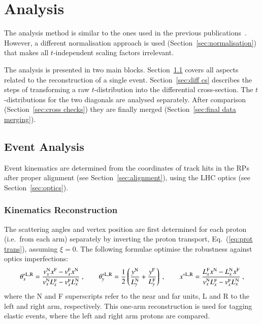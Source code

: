 \section{Analysis}
\label{sec:analysis}

The analysis method is similar to the ones used in the previous publications~\cite{epl101-el,prl111}.
However, a different normalisation approach is used (Section~\ref{sec:normalisation}) that makes all $t$-independent scaling factors irrelevant.

The analysis is presented in two main blocks. Section~\ref{sec:event anal} covers all aspects related to the reconstruction of a single event.
Section~\ref{sec:diff cs} describes the steps of transforming a raw $t$-distribution into the differential cross-section. The $t$-distributions for the two diagonals are analysed separately. After comparison (Section~\ref{sec:cross checks}) they are finally merged (Section~\ref{sec:final data merging}).


\subsection{Event Analysis}
\label{sec:event anal}

Event kinematics are determined from the coordinates of track hits in the RPs after proper alignment (see Section~\ref{sec:alignment}), using the LHC optics (see Section~\ref{sec:optics}).



\subsubsection{Kinematics Reconstruction}
\label{sec:kinematics}

The scattering angles and vertex position are first determined for each proton (i.e.~from each arm) separately by inverting the proton transport, Eq.~(\ref{eq:prot trans}), assuming $\xi = 0$. The following formulae optimise the robustness against optics imperfections:
\begin{equation}
\label{eq:kin 1a}
	\theta_x^{*\rm L,R} = {v_x^{\rm N} x^{\rm F} - v_x^{\rm F} x^{\rm N}\over v_x^{\rm N} L_x^{\rm F} - v_x^{\rm F} L_x^{\rm N}}\ ,\qquad
	\theta_y^{*\rm L,R} = {1\over 2} \left( {y^{\rm N}\over L_y^{\rm N}} + {y^{\rm F}\over L_y^{\rm F}} \right)\ ,\qquad
	x^{*\rm L,R} = {L_x^{\rm F} x^{\rm N} - L_x^{\rm N} x^{\rm F}\over v_x^{\rm N} L_x^{\rm F} - v_x^{\rm F} L_x^{\rm N} }\ ,
\end{equation}
where the N and F superscripts refer to the near and far units, L and R to the 
left and right arm, respectively. This one-arm reconstruction is used for tagging elastic events, where the left and right arm protons are compared.

